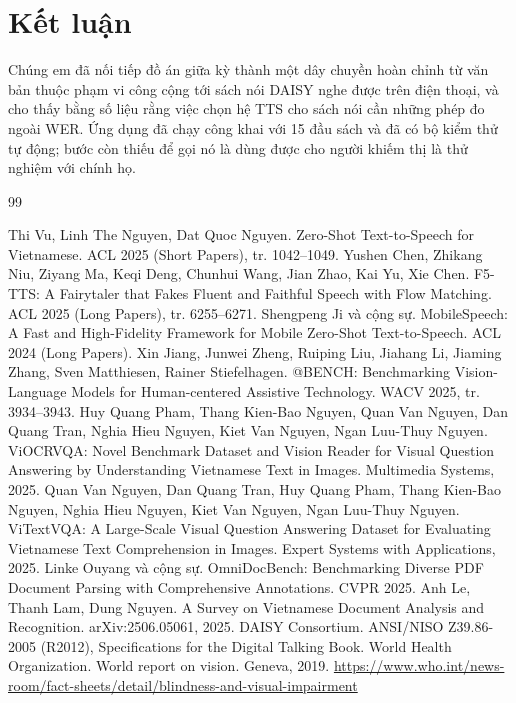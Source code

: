 \documentclass[12pt,a4paper]{article}
\begin{document}
\section{Kết luận}

Chúng em đã nối tiếp đồ án giữa kỳ thành một dây chuyền hoàn chỉnh từ văn bản thuộc phạm vi công cộng tới sách nói DAISY nghe được trên điện thoại, và cho thấy bằng số liệu rằng việc chọn hệ TTS cho sách nói cần những phép đo ngoài WER. Ứng dụng đã chạy công khai với 15 đầu sách và đã có bộ kiểm thử tự động; bước còn thiếu để gọi nó là dùng được cho người khiếm thị là thử nghiệm với chính họ.

\begin{thebibliography}{99}
\setlength{\itemsep}{2pt}
 Thi Vu, Linh The Nguyen, Dat Quoc Nguyen. Zero-Shot Text-to-Speech for Vietnamese. ACL 2025 (Short Papers), tr. 1042--1049.
 Yushen Chen, Zhikang Niu, Ziyang Ma, Keqi Deng, Chunhui Wang, Jian Zhao, Kai Yu, Xie Chen. F5-TTS: A Fairytaler that Fakes Fluent and Faithful Speech with Flow Matching. ACL 2025 (Long Papers), tr. 6255--6271.
 Shengpeng Ji và cộng sự. MobileSpeech: A Fast and High-Fidelity Framework for Mobile Zero-Shot Text-to-Speech. ACL 2024 (Long Papers).
 Xin Jiang, Junwei Zheng, Ruiping Liu, Jiahang Li, Jiaming Zhang, Sven Matthiesen, Rainer Stiefelhagen. @BENCH: Benchmarking Vision-Language Models for Human-centered Assistive Technology. WACV 2025, tr. 3934--3943.
 Huy Quang Pham, Thang Kien-Bao Nguyen, Quan Van Nguyen, Dan Quang Tran, Nghia Hieu Nguyen, Kiet Van Nguyen, Ngan Luu-Thuy Nguyen. ViOCRVQA: Novel Benchmark Dataset and Vision Reader for Visual Question Answering by Understanding Vietnamese Text in Images. Multimedia Systems, 2025.
 Quan Van Nguyen, Dan Quang Tran, Huy Quang Pham, Thang Kien-Bao Nguyen, Nghia Hieu Nguyen, Kiet Van Nguyen, Ngan Luu-Thuy Nguyen. ViTextVQA: A Large-Scale Visual Question Answering Dataset for Evaluating Vietnamese Text Comprehension in Images. Expert Systems with Applications, 2025.
 Linke Ouyang và cộng sự. OmniDocBench: Benchmarking Diverse PDF Document Parsing with Comprehensive Annotations. CVPR 2025.
 Anh Le, Thanh Lam, Dung Nguyen. A Survey on Vietnamese Document Analysis and Recognition. arXiv:2506.05061, 2025.
 DAISY Consortium. ANSI/NISO Z39.86-2005 (R2012), Specifications for the Digital Talking Book.
 World Health Organization. World report on vision. Geneva, 2019. \url{https://www.who.int/news-room/fact-sheets/detail/blindness-and-visual-impairment}

\end{thebibliography}
\end{document}
